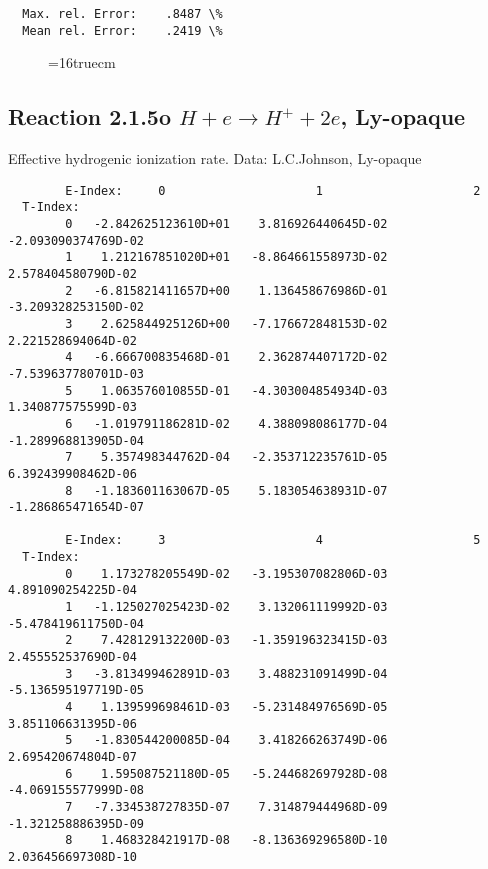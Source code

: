 \documentclass[12pt,dvipdfmx]{article}
\begin{document}
\begin{small}
\begin{verbatim}
  Max. rel. Error:    .8487 \%
  Mean rel. Error:    .2419 \%
\end{verbatim}\end{small}
\begin{figure} \label{2.1.5}
\epsfxsize=16truecm
\end{figure}
\newpage

\subsection{
Reaction 2.1.5o  $H + e \rightarrow H^+ + 2e $, Ly-opaque}


   Effective hydrogenic ionization rate. Data: L.C.Johnson, Ly-opaque

\begin{small}\begin{verbatim}
        E-Index:     0                     1                     2
  T-Index:
        0   -2.842625123610D+01    3.816926440645D-02   -2.093090374769D-02
        1    1.212167851020D+01   -8.864661558973D-02    2.578404580790D-02
        2   -6.815821411657D+00    1.136458676986D-01   -3.209328253150D-02
        3    2.625844925126D+00   -7.176672848153D-02    2.221528694064D-02
        4   -6.666700835468D-01    2.362874407172D-02   -7.539637780701D-03
        5    1.063576010855D-01   -4.303004854934D-03    1.340877575599D-03
        6   -1.019791186281D-02    4.388098086177D-04   -1.289968813905D-04
        7    5.357498344762D-04   -2.353712235761D-05    6.392439908462D-06
        8   -1.183601163067D-05    5.183054638931D-07   -1.286865471654D-07

        E-Index:     3                     4                     5
  T-Index:
        0    1.173278205549D-02   -3.195307082806D-03    4.891090254225D-04
        1   -1.125027025423D-02    3.132061119992D-03   -5.478419611750D-04
        2    7.428129132200D-03   -1.359196323415D-03    2.455552537690D-04
        3   -3.813499462891D-03    3.488231091499D-04   -5.136595197719D-05
        4    1.139599698461D-03   -5.231484976569D-05    3.851106631395D-06
        5   -1.830544200085D-04    3.418266263749D-06    2.695420674804D-07
        6    1.595087521180D-05   -5.244682697928D-08   -4.069155577999D-08
        7   -7.334538727835D-07    7.314879444968D-09   -1.321258886395D-09
        8    1.468328421917D-08   -8.136369296580D-10    2.036456697308D-10


\end{verbatim}
\end{small}
\end{document}

